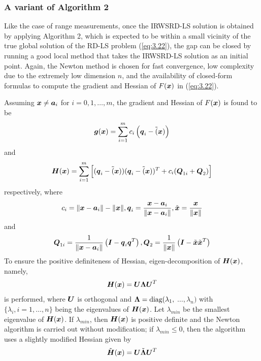 \subsubsection{A variant of Algorithm 2}

Like the case of range measurements, once the IRWSRD-LS solution is obtained by applying Algorithm 2, which is expected to be within a small vicinity of the true global solution of the RD-LS problem (\ref{eq:3.22}), the gap can be closed by running a good local method that takes the IRWSRD-LS solution as an initial point. Again, the Newton method is chosen for fast convergence, low complexity due to the extremely low dimension $n$, and the availability of closed-form formulas to compute the gradient and Hessian of $F(\mbox{\boldmath$x$})$ in (\ref{eq:3.22}).

Assuming $\mbox{\boldmath$x$}\neq\mbox{\boldmath$a$}_i$ for $i = 0, 1,\ldots, m$, the gradient and Hessian of $F(\mbox{\boldmath$x$})$ is found to be
\begin{equation}
\nonumber
\mbox{\boldmath$g$}(\mbox{\boldmath$x$})=\sum_{i=1}^m c_i\left(\mbox{\boldmath$q$}_i - \tilde(\mbox{\boldmath$x$})\right)
\end{equation}
and
\begin{equation}
\nonumber
\mbox{\boldmath$H$}(\mbox{\boldmath$x$})=\sum_{i=1}^m \left[(\mbox{\boldmath$q$}_i-\tilde(\mbox{\boldmath$x$}))(\mbox{\boldmath$q$}_i-\tilde(\mbox{\boldmath$x$}))^T+c_i(\mbox{\boldmath$Q$}_{1i}+\mbox{\boldmath$Q$}_2)\right]
\end{equation}
respectively, where
\begin{equation}
\nonumber
c_i=\|\mbox{\boldmath$x$}-\mbox{\boldmath$a$}_i\|-\|\mbox{\boldmath$x$}\|, \mbox{\boldmath$q$}_i=\frac{\mbox{\boldmath$x$}-\mbox{\boldmath$a$}_i}{\|\mbox{\boldmath$x$}-\mbox{\boldmath$a$}_i\|}, \tilde{\mbox{\boldmath$x$}}=\frac{\mbox{\boldmath$x$}}{\|\mbox{\boldmath$x$}\|}
\end{equation}
and
\begin{equation}
\nonumber
\mbox{\boldmath$Q$}_{1i}=\frac{1}{\|\mbox{\boldmath$x$}-\mbox{\boldmath$a$}_i\|}\left(\mbox{\boldmath$I$}-\mbox{\boldmath$q$}_i\mbox{\boldmath$q$}^T\right), \mbox{\boldmath$Q$}_2=\frac{1}{\|\mbox{\boldmath$x$}\|}\left(\mbox{\boldmath$I$}-\tilde{\mbox{\boldmath$x$}}\tilde{\mbox{\boldmath$x$}}^T\right)
\end{equation}
To ensure the positive definiteness of Hessian, eigen-decomposition of $\mbox{\boldmath$H$}(\mbox{\boldmath$x$})$, namely,
\begin{equation}
\nonumber
\mbox{\boldmath$H$}(\mbox{\boldmath$x$})=\mbox{\boldmath$U$}\mbox{\boldmath{$\Lambda$}}\mbox{\boldmath$U$}^T
\end{equation}
is performed, where $\mbox{\boldmath$U$}$ is orthogonal and $\mbox{\boldmath{$\Lambda$}}=\mbox{diag}(\lambda_1,$ $\ldots,\lambda_n)$ with $\{\lambda_i, i=1,\ldots,n\}$ being the eigenvalues of $\mbox{\boldmath$H$}(\mbox{\boldmath$x$})$. Let $\lambda_{min}$ be the smallest eigenvalue of $\mbox{\boldmath$H$}(\mbox{\boldmath$x$})$. If $\lambda_{min}$, then $\mbox{\boldmath$H$}(\mbox{\boldmath$x$})$ is positive definite and the Newton algorithm is carried out without modification; if $\lambda_{min}\leq0$, then the algorithm uses a slightly modified Hessian given by
\begin{equation}
\nonumber
\tilde{\mbox{\boldmath$H$}}(\mbox{\boldmath$x$})=\mbox{\boldmath$U$}\tilde{\mbox{\boldmath{$\Lambda$}}}\mbox{\boldmath$U$}^T
\end{equation}
